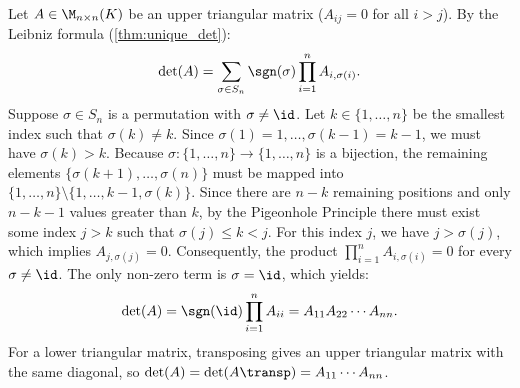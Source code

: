 \begin{exercisesolution}
\label{sol:triangular_matrix_determinant}
Let $A \in \M_{n \times n}(K)$ be an upper triangular matrix ($A_{ij} = 0$ for all $i > j$).
By the Leibniz formula (\cref{thm:unique_det}):
\[
\det(A) = \sum_{\sigma \in S_n} \sgn(\sigma) \prod_{i=1}^n A_{i, \sigma(i)}.
\]
Suppose $\sigma \in S_n$ is a permutation with $\sigma \ne \id$.
Let $k \in \{1, \dots, n\}$ be the smallest index such that $\sigma(k) \ne k$.
Since $\sigma(1) = 1, \dots, \sigma(k-1) = k-1$, we must have $\sigma(k) > k$.
Because $\sigma \colon \{1, \dots, n\} \to \{1, \dots, n\}$ is a bijection, the remaining elements $\{\sigma(k+1), \dots, \sigma(n)\}$ must be mapped into $\{1, \dots, n\} \setminus \{1, \dots, k-1, \sigma(k)\}$.
Since there are $n - k$ remaining positions and only $n - k - 1$ values greater than $k$, by the Pigeonhole Principle there must exist some index $j > k$ such that $\sigma(j) \le k < j$.
For this index $j$, we have $j > \sigma(j)$, which implies $A_{j, \sigma(j)} = 0$.
Consequently, the product $\prod_{i=1}^n A_{i, \sigma(i)} = 0$ for every $\sigma \ne \id$.
The only non-zero term is $\sigma = \id$, which yields:
\[
\det(A) = \sgn(\id) \prod_{i=1}^n A_{ii} = A_{11} A_{22} \cdots A_{nn}.
\]
For a lower triangular matrix, transposing gives an upper triangular matrix with the same diagonal, so $\det(A) = \det(A\transp) = A_{11} \cdots A_{nn}$.
\end{exercisesolution}

